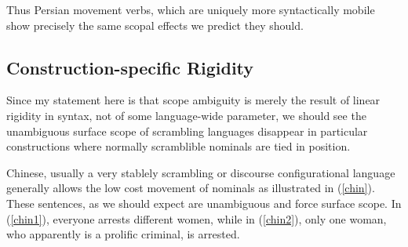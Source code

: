 \documentclass{article}
\begin{document}
\begin{exe}
\end{exe}

Thus Persian movement verbs, which are uniquely more syntactically mobile show precisely the same scopal effects we predict they should.

\subsection{Construction-specific Rigidity}

Since my statement here is that scope ambiguity is merely the result of linear rigidity in syntax, not of some language-wide parameter, we should see the unambiguous surface scope of scrambling languages disappear in particular constructions where normally scramblible nominals are tied in position.

Chinese, usually a very stablely scrambling or discourse configurational language generally allows the low cost movement of nominals as illustrated in (\ref{chin}). These sentences, as we should expect are unambiguous and force surface scope. In (\ref{chin1}), everyone arrests different women, while in (\ref{chin2}), only one woman, who apparently is a prolific criminal, is arrested.

\begin{exe}
\ex \begin{xlist}\label{chin}
\end{xlist}
\end{exe}
\end{document}
